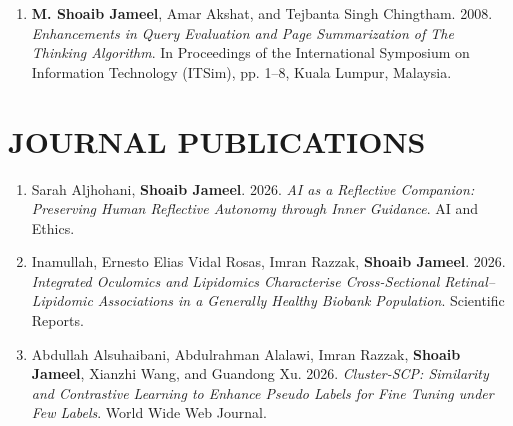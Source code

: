 \documentclass[margin]{res}
\begin{document}
\begin{resume}
\begin{enumerate}
\item \textbf{M. Shoaib Jameel}, Amar Akshat, and Tejbanta Singh Chingtham. 2008. \textit{Enhancements in Query Evaluation and Page Summarization of The Thinking Algorithm}. In Proceedings of the International Symposium on Information Technology (ITSim), pp. 1--8, Kuala Lumpur, Malaysia.
\end{enumerate}

\section{JOURNAL PUBLICATIONS}
\begin{enumerate} \itemsep -10pt
    \item Sarah Aljhohani, \textbf{Shoaib Jameel}. 2026. \textit{AI as a Reflective Companion: Preserving Human Reflective Autonomy through Inner Guidance}. AI and Ethics. \\
    \item Inamullah, Ernesto Elias Vidal Rosas, Imran Razzak, \textbf{Shoaib Jameel}. 2026. \textit{Integrated Oculomics and Lipidomics Characterise Cross-Sectional Retinal–Lipidomic Associations in a Generally Healthy Biobank Population}. Scientific Reports. \\

    \item Abdullah Alsuhaibani, Abdulrahman Alalawi, Imran Razzak, \textbf{Shoaib Jameel}, Xianzhi Wang, and Guandong Xu. 2026. \textit{Cluster-SCP: Similarity and Contrastive Learning to Enhance Pseudo Labels for Fine Tuning under Few Labels}. World Wide Web Journal. \\
    

\end{enumerate}
\end{resume}
\end{document}

